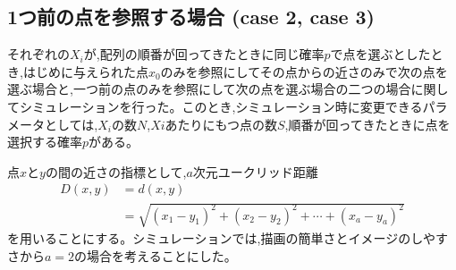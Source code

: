 \subsection{1つ前の点を参照する場合 (case 2, case 3)}

それぞれの$X_{i}$が,配列の順番が回ってきたときに同じ確率$p$で点を選ぶとしたとき,はじめに与えられた点$x_{0}$のみを参照にしてその点からの近さのみで次の点を選ぶ場合と,一つ前の点のみを参照にして次の点を選ぶ場合の二つの場合に関してシミュレーションを行った。このとき,シミュレーション時に変更できるパラメータとしては,$X_{i}$の数$N$,$X{i}$あたりにもつ点の数$S$,順番が回ってきたときに点を選択する確率$p$がある。

点$x$と$y$の間の近さの指標として,$a$次元ユークリッド距離
\begin{align}D(x, y) &= d(x,y) \nonumber\\
&= \sqrt{(x_{1} - y_{1})^{2} + (x_{2} - y_{2})^{2} + \cdots + (x_{a} - y_{a})^{2}}\end{align}
を用いることにする。シミュレーションでは,描画の簡単さとイメージのしやすさから$a=2$の場合を考えることにした。

